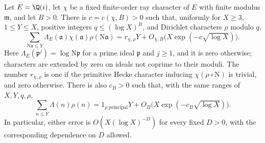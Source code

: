 \begin{lemma}
\label{lem:gaussian-hecke-sw}
Let $E=\Q(i)$, let $\chi$ be a fixed finite-order ray character of $E$
with finite modulus $\mathfrak m$, and let $B>0$.
There is $c=c(\chi,B)>0$ such that, uniformly for $X\geq3$,
$1\leq Y\leq X$, positive integers $q\leq(\log X)^B$, and Dirichlet
characters $\rho$ modulo $q$,
\begin{equation}\label{eq:gaussian-hecke-sw-estimate}
 \sum_{\mathrm N\mathfrak a\leq Y}
   \Lambda_E(\mathfrak a)\chi(\mathfrak a)\rho(\mathrm N\mathfrak a)
 =r_{\chi,\rho}Y+
 O_{\chi,B}\bigl(X\exp(-c\sqrt{\log X})\bigr).
\end{equation}
Here $\Lambda_E(\mathfrak p^j)=\log\mathrm N\mathfrak p$ for a prime
ideal $\mathfrak p$ and $j\geq1$, and it is zero otherwise; characters
are extended by zero on ideals not coprime to their moduli.
The number $r_{\chi,\rho}$ is one if the primitive Hecke character
inducing $\chi(\rho\circ\mathrm N)$ is trivial, and zero otherwise.
There is also $c_B>0$ such that, with the same ranges of $X,Y,q,\rho$,
\begin{equation}\label{eq:rational-sw-estimate}
 \sum_{n\leq Y}\Lambda(n)\rho(n)
 =1_{\rho\ \mathrm{principal}}Y+
 O_B\bigl(X\exp(-c_B\sqrt{\log X})\bigr).
\end{equation}
In particular, either error is $O(X(\log X)^{-D})$ for every fixed
$D>0$, with the corresponding dependence on $D$ allowed.
\end{lemma}

